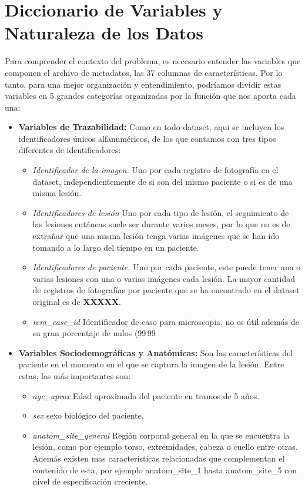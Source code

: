 \section{Diccionario de Variables y Naturaleza de los Datos}
Para comprender el contexto del problema, es necesario entender las variables que componen el archivo de metadatos, las 37 columnas de características. Por lo tanto, para una mejor organización y entendimiento, podríamos dividir estas variables en 5 grandes categorías organizadas por la función que nos aporta cada una:

\begin{itemize}
	\item \textbf{Variables de Trazabilidad:} Como en todo dataset, aqui se incluyen los identificadores únicos alfanuméricos, de los que contamos con tres tipos diferentes de identificadores:
	\begin{itemize}
		\item \textit{Identificador de la imagen.} Uno por cada registro de fotografía en el dataset, independientemente de si son del mismo paciente o si es de una misma lesión.
		\item \textit{Identificadores de lesión} Uno por cada tipo de lesión, el seguimiento de las lesiones cutáneas suele ser durante varios meses, por lo que no es de extrañar que una misma lesión tenga varias imágenes que se han ido tomando a lo largo del tiempo en un paciente.
		\item \textit{Identificadores de paciente.} Uno por cada paciente, este puede tener una o varias lesiones con una o varias imágenes cada lesión. La mayor cantidad de registros de fotografías por paciente que se ha encontrado en el dataset original es de \textbf{XXXXX}.
		\item \textit{rcm\_case\_id} Identificador de caso para microscopia, no es útil además de su gran porcentaje de nulos (99\,99%
	\end{itemize}

	\item \textbf{Variables Sociodemográficas y Anatómicas:} Son las características del paciente en el momento en el que se captura la imagen de la lesión. Entre estas, las más importantes son:
	\begin{itemize}
		\item \textit{age\_aprox} Edad aproximada del paciente en tramos de 5 años.
		\item \textit{sex} sexo biológico del paciente.
		\item \textit{anatom\_site\_general} Región corporal general en la que se encuentra la lesión, como por ejemplo torso, extremidades, cabeza o cuello entre otras. Además existen mas características relacionadas que complementan el contenido de esta, por ejemplo anatom\_site\_1 hasta anatom\_site\_5 con nivel de especificación creciente.
	\end{itemize}
	

\end{itemize}
